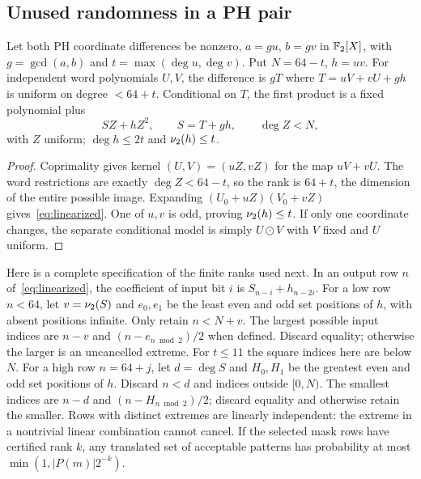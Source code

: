 \subsection{Unused randomness in a PH pair}
\begin{lemma}\label{lem:linearized}
Let both PH coordinate differences be nonzero, $a=gu$, $b=gv$ in $\mathbb F_2[X]$, with $g=\gcd(a,b)$ and $t=\max(\deg u,\deg v)$. Put $N=64-t$, $h=uv$. For independent word polynomials $U,V$, the difference is $gT$ where $T=uV+vU+gh$ is uniform on degree $<64+t$. Conditional on $T$, the first product is a fixed polynomial plus
\begin{equation}\label{eq:linearized}
 SZ+hZ^2,\qquad S=T+gh,\qquad \deg Z<N,
\end{equation}
with $Z$ uniform; $\deg h\le2t$ and $\nu_2(h)\le t$.
\end{lemma}
\begin{proof}
Coprimality gives kernel $(U,V)=(uZ,vZ)$ for the map $uV+vU$. The word restrictions are exactly $\deg Z<64-t$, so the rank is $64+t$, the dimension of the entire possible image. Expanding $(U_0+uZ)(V_0+vZ)$ gives~\eqref{eq:linearized}. One of $u,v$ is odd, proving $\nu_2(h)\le t$. If only one coordinate changes, the separate conditional model is simply $U\odot V$ with $V$ fixed and $U$ uniform.
\end{proof}

Here is a complete specification of the finite ranks used next. In an output row $n$ of~\eqref{eq:linearized}, the coefficient of input bit $i$ is $S_{n-i}+h_{n-2i}$. For a low row $n<64$, let $v=\nu_2(S)$ and $e_0,e_1$ be the least even and odd set positions of $h$, with absent positions infinite. Only retain $n<N+v$. The largest possible input indices are $n-v$ and $(n-e_{n\bmod2})/2$ when defined. Discard equality; otherwise the larger is an uncancelled extreme. For $t\le11$ the square indices here are below $N$. For a high row $n=64+j$, let $d=\deg S$ and $H_0,H_1$ be the greatest even and odd set positions of $h$. Discard $n<d$ and indices outside $[0,N)$. The smallest indices are $n-d$ and $(n-H_{n\bmod2})/2$; discard equality and otherwise retain the smaller. Rows with distinct extremes are linearly independent: the extreme in a nontrivial linear combination cannot cancel. If the selected mask rows have certified rank $k$, any translated set of acceptable patterns has probability at most $\min(1,|P(m)|2^{-k})$.

